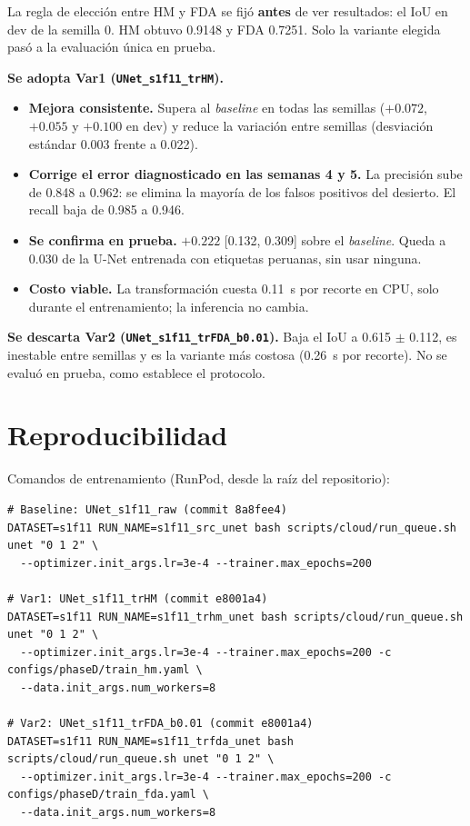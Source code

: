 La regla de elección entre HM y FDA se fijó \textbf{antes} de ver resultados: el IoU en dev de la
semilla 0. HM obtuvo 0.9148 y FDA 0.7251. Solo la variante elegida pasó a la evaluación única en
prueba.

\textbf{Se adopta Var1 (\texttt{UNet\_\allowbreak{}s1f11\_\allowbreak{}trHM}).}
\begin{itemize}
    \item \textbf{Mejora consistente.} Supera al \textit{baseline} en todas las semillas ($+0.072$,
    $+0.055$ y $+0.100$ en dev) y reduce la variación entre semillas (desviación estándar 0.003 frente
    a 0.022).
    \item \textbf{Corrige el error diagnosticado en las semanas 4 y 5.} La precisión sube de 0.848 a
    0.962: se elimina la mayoría de los falsos positivos del desierto. El recall baja de 0.985 a 0.946.
    \item \textbf{Se confirma en prueba.} $+0.222$ [0.132, 0.309] sobre el \textit{baseline}. Queda a
    0.030 de la U-Net entrenada con etiquetas peruanas, sin usar ninguna.
    \item \textbf{Costo viable.} La transformación cuesta 0.11~s por recorte en CPU, solo durante el
    entrenamiento; la inferencia no cambia.
\end{itemize}

\textbf{Se descarta Var2 (\texttt{UNet\_\allowbreak{}s1f11\_\allowbreak{}trFDA\_\allowbreak{}b0.01}).} Baja el IoU a 0.615 $\pm$ 0.112, es
inestable entre semillas y es la variante más costosa (0.26~s por recorte). No se evaluó en prueba,
como establece el protocolo.

\section{Reproducibilidad}

Comandos de entrenamiento (RunPod, desde la raíz del repositorio):

{\footnotesize
\begin{verbatim}
# Baseline: UNet_s1f11_raw (commit 8a8fee4)
DATASET=s1f11 RUN_NAME=s1f11_src_unet bash scripts/cloud/run_queue.sh unet "0 1 2" \
  --optimizer.init_args.lr=3e-4 --trainer.max_epochs=200

# Var1: UNet_s1f11_trHM (commit e8001a4)
DATASET=s1f11 RUN_NAME=s1f11_trhm_unet bash scripts/cloud/run_queue.sh unet "0 1 2" \
  --optimizer.init_args.lr=3e-4 --trainer.max_epochs=200 -c configs/phaseD/train_hm.yaml \
  --data.init_args.num_workers=8

# Var2: UNet_s1f11_trFDA_b0.01 (commit e8001a4)
DATASET=s1f11 RUN_NAME=s1f11_trfda_unet bash scripts/cloud/run_queue.sh unet "0 1 2" \
  --optimizer.init_args.lr=3e-4 --trainer.max_epochs=200 -c configs/phaseD/train_fda.yaml \
  --data.init_args.num_workers=8
\end{verbatim}
}

